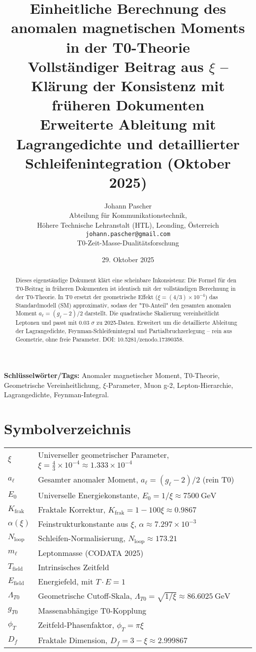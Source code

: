 \documentclass[12pt,a4paper]{article}
\title{\textbf{Einheitliche Berechnung des anomalen magnetischen Moments in der T0-Theorie}\\[0.5cm]
	\large Vollständiger Beitrag aus $\xi$ – Klärung der Konsistenz mit früheren Dokumenten\\[0.3cm]
	\normalsize Erweiterte Ableitung mit Lagrangedichte und detaillierter Schleifenintegration (Oktober 2025)}
\author{Johann Pascher\\
	\small Abteilung für Kommunikationstechnik,\\
	\small Höhere Technische Lehranstalt (HTL), Leonding, Österreich\\
	\small \texttt{johann.pascher@gmail.com}\\
	\small T0-Zeit-Masse-Dualitätsforschung}
\date{29. Oktober 2025}
\begin{document}
	
	\maketitle
	\thispagestyle{fancy}
	
	\begin{abstract}
		Dieses eigenständige Dokument klärt eine scheinbare Inkonsistenz: Die Formel für den T0-Beitrag in früheren Dokumenten ist identisch mit der vollständigen Berechnung in der T0-Theorie. In T0 ersetzt der geometrische Effekt ($\xi = (4/3) \times 10^{-4}$) das Standardmodell (SM) approximativ, sodass der "T0-Anteil" den gesamten anomalen Moment $a_\ell = (g_\ell - 2)/2$ darstellt. Die quadratische Skalierung vereinheitlicht Leptonen und passt mit 0.03 $\sigma$ zu 2025-Daten. Erweitert um die detaillierte Ableitung der Lagrangedichte, Feynman-Schleifenintegral und Partialbruchzerlegung – rein aus Geometrie, ohne freie Parameter. DOI: 10.5281/zenodo.17390358.
	\end{abstract}
	
	\textbf{Schlüsselwörter/Tags:} Anomaler magnetischer Moment, T0-Theorie, Geometrische Vereinheitlichung, $\xi$-Parameter, Muon g-2, Lepton-Hierarchie, Lagrangedichte, Feynman-Integral.
	
	\tableofcontents
	
	\section*{Symbolverzeichnis}
	
	\begin{tabular}{ll}
		$\xi$ & Universeller geometrischer Parameter, $\xi = \frac{4}{3} \times 10^{-4} \approx 1.333 \times 10^{-4}$ \\
		$a_\ell$ & Gesamter anomaler Moment, $a_\ell = (g_\ell - 2)/2$ (rein T0) \\
		$E_0$ & Universelle Energiekonstante, $E_0 = 1/\xi \approx \SI{7500}{\giga\electronvolt}$ \\
		$K_\text{frak}$ & Fraktale Korrektur, $K_\text{frak} = 1 - 100 \xi \approx 0.9867$ \\
		$\alpha(\xi)$ & Feinstrukturkonstante aus $\xi$, $\alpha \approx 7.297 \times 10^{-3}$ \\
		$N_\text{loop}$ & Schleifen-Normalisierung, $N_\text{loop} \approx 173.21$ \\
		$m_\ell$ & Leptonmasse (CODATA 2025) \\
		$T_\text{field}$ & Intrinsisches Zeitfeld \\
		$E_\text{field}$ & Energiefeld, mit $T \cdot E = 1$ \\
		$\Lambda_{T0}$ & Geometrische Cutoff-Skala, $\Lambda_{T0} = \sqrt{1/\xi} \approx \SI{86.6025}{\giga\electronvolt}$ \\
		$g_{T0}$ & Massenabhängige T0-Kopplung \\
		$\phi_T$ & Zeitfeld-Phasenfaktor, $\phi_T = \pi \xi$ \\
		$D_f$ & Fraktale Dimension, $D_f = 3 - \xi \approx 2.999867$ \\
	\end{tabular}
	
\end{document}
